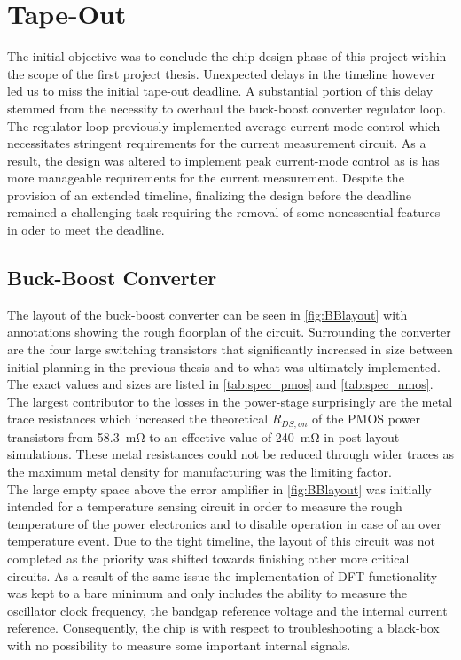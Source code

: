 \section{Tape-Out}
\label{sec:tapout}
The initial objective was to conclude the chip design phase of this project within the scope of the first project thesis. Unexpected delays in the timeline however led us to miss the initial tape-out deadline. A substantial portion of this delay stemmed from the necessity to overhaul the buck-boost converter regulator loop. The regulator loop previously implemented average current-mode control which necessitates stringent requirements for the current measurement circuit. As a result, the design was altered to implement peak current-mode control as is has more manageable requirements for the current measurement. Despite the provision of an extended timeline, finalizing the design before the deadline remained a challenging task requiring the removal of some nonessential features in oder to meet the deadline. 

\subsection{Buck-Boost Converter}
The layout of the buck-boost converter can be seen in  \autoref{fig:BBlayout} with annotations showing the rough floorplan of the circuit. Surrounding the converter are the four large switching transistors that significantly increased in size between initial planning in the previous thesis and to what was ultimately implemented. The exact values and sizes are listed in \autoref{tab:spec_pmos} and \autoref{tab:spec_nmos}. The largest contributor to the losses in the power-stage surprisingly are the metal trace resistances which increased the theoretical $R_{DS,on}$ of the \ac{PMOS} power transistors from \qty{58.3}{\milli\ohm} to an effective value of \qty{240}{\milli\ohm} in post-layout simulations. These metal resistances could not be reduced through wider traces as the maximum metal density for manufacturing was the limiting factor.\\
The large empty space above the error amplifier in \autoref{fig:BBlayout} was initially intended for a temperature sensing circuit in order to measure the rough temperature of the power electronics and to disable operation in case of an over temperature event. Due to the tight timeline, the layout of this circuit was not completed as the priority was shifted towards finishing other more critical circuits. As a result of the same issue the implementation of \ac{DFT} functionality was kept to a bare minimum and only includes the ability to measure the oscillator clock frequency, the bandgap reference voltage and the internal current reference. Consequently, the chip is with respect to troubleshooting a black-box with no possibility to measure some important internal signals.


